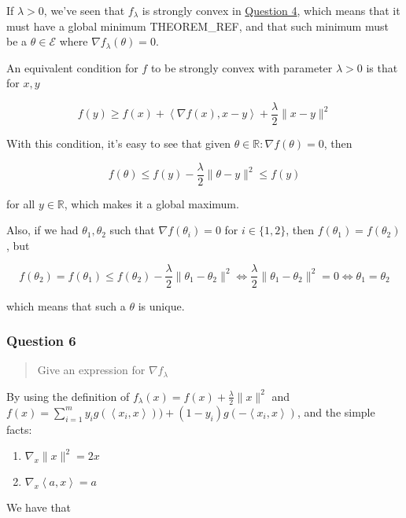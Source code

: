 \documentclass[
]{article}
\begin{document}
If \(\lambda > 0\), we've seen that \(f_\lambda\) is strongly convex in
\protect\hyperlink{question-4-4}{Question 4}, which means that it must
have a global minimum THEOREM\_REF, and that such minimum must be a
\(\theta\in\mathcal{E}\) where \(\nabla f_\lambda(\theta) = 0\).

An equivalent condition for \(f\) to be strongly convex with parameter
\(\lambda  > 0\) is that for \(x,y\)

\[f(y) \ge f(x) + \left<\nabla  f(x), x-y\right> + \frac{\lambda}{2}\lVert  x -y\rVert^2\]

With this condition, it's easy to see that given
\(\theta\in\mathbb{R}:\nabla  f(\theta) = 0\), then

\[f(\theta) \le f(y) - \frac{\lambda}{2}\lVert \theta      -y\rVert^2 \le f(y)\]

for all \(y\in\mathbb{R}\), which makes it a global maximum.

Also, if we had \(\theta_1, \theta_2\) such that
\(\nabla f(\theta_i) = 0\) for \(i\in\{1,2\}\), then
\(f(\theta_1) = f(\theta_2)\), but

\[f(\theta_2) = f(\theta_1) \le f(\theta_2) - \frac{\lambda}{2}\lVert  \theta_1  - \theta_2 \rVert^2 \iff \frac{\lambda}{2}\lVert \theta_1   - \theta_2 \rVert^2 = 0 \iff \theta_1 = \theta_2\]

which means that such a \(\theta\) is unique.

\hypertarget{question-6}{%
\subsubsection{Question 6}\label{question-6}}

\begin{quote}
Give an expression for \(\nabla f_\lambda\)
\end{quote}

By using the definition of
\(f_\lambda(x) = f(x) + \frac{\lambda}{2}\lVert x\rVert^2\) and
\(f(x) = \sum^{m}_{i=1}y_ig(\left<x_i,x\right>)) +  (1-y_i)g(-\left<x_i,x\right>)\),
and the simple facts:

\begin{enumerate}
\def\labelenumi{\arabic{enumi}.}
\item
  \(\nabla_x \lVert x \rVert^2 = 2x\)
\item
  \(\nabla_x\left<a,x\right>  = a\)
\end{enumerate}

We have that
\end{document}
